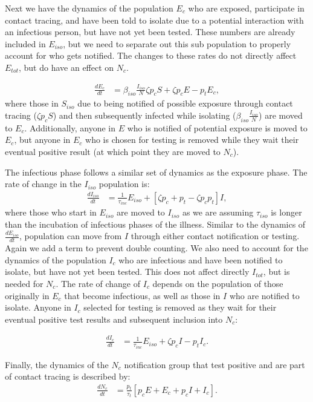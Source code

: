 \documentclass[notitlepage, superscriptaddress]{revtex4-2}
\begin{document}
Next we have the dynamics of the population $E_{c}$ who are exposed, participate in contact tracing, and have been told to isolate due to a potential interaction with an infectious person, but have not yet been tested. These numbers are already included in $E_{iso}$, but we need to separate out this sub population to properly account for who gets notified. The changes to these rates do not directly affect $E_{tot}$, but do have an effect on $N_{c}$.

\begin{eqnarray}
\label{E:dE_c}
\frac{dE_{c}}{dt} &= \beta_{iso} \frac{I_{iso}}{N} \zeta p_{c} S +  \zeta p_{c} E  - p_{t}E_{c},
\end{eqnarray}
where those in $S_{iso}$ due to being notified of possible exposure through contact tracing ($\zeta p_{c} S$) and then subsequently infected while isolating ($\beta_{iso} \frac{I_{iso}}{N}$) are moved to $E_{c}$. Additionally, anyone in $E$ who is notified of potential exposure is moved to $E_c$, but anyone in $E_c$ who is chosen for testing is removed while they wait their eventual positive result (at which point they are moved to $N_c$).

The infectious phase follows a similar set of dynamics as the exposure phase. The rate of change in the $I_{iso}$ population is:
\begin{eqnarray}
\label{E:dI_iso}
\frac{dI_{iso}}{dt} &= \frac{1}{\tau_{inc}} E_{iso} +  [\zeta p_{c} + p_{t} - \zeta p_{c} p_{t}] I,
\end{eqnarray}
where those who start in $E_{iso}$ are moved to $I_{iso}$ as we are assuming $\tau_{iso}$ is longer than the incubation of infectious phases of the illness. Similar to the dynamics of $\frac{dE_{iso}}{dt}$, population can move from $I$ through either contact notification or testing. Again we add a term to prevent double counting. We also need to account for the dynamics of the population $I_c$ who are infectious and have been notified to isolate, but have not yet been tested. This does not affect directly $I_{tot}$, but is needed for $N_{c}$. The rate of change of $I_c$ depends on the population of those originally in $E_c$ that become infectious, as well as those in $I$ who are notified to isolate. Anyone in $I_{c}$ selected for testing is removed as they wait for their eventual positive test results and subsequent inclusion into $N_c$:

\begin{eqnarray}
\label{E:dI_c}
\frac{dI_{c}}{dt} &= \frac{1}{\tau_{inc}} E_{iso} +  \zeta p_{c} I  - p_{t}I_{c}.
\end{eqnarray}

Finally, the dynamics of the $N_c$ notification group that test positive and are part of contact tracing is described by:
\begin{eqnarray}
\label{E:dN_c}
\frac{dN_{c}}{dt} &= \frac{p_{t}}{\tau_{t}}[p_{c}E + E_{c} + p_{c}I + I_{c}].
\end{eqnarray}

% 
\end{document}

